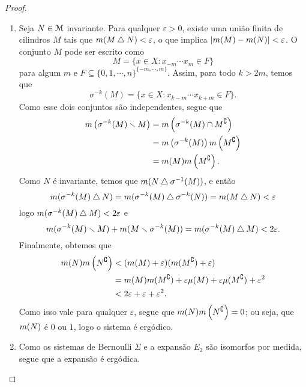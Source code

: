\begin{proof}
\begin{enumerate}
	\item Seja $N \in \mathcal{M}$ invariante. Para qualquer $\varepsilon>0$, existe uma união finita de cilindros $M$ tais que $m(M \mathbin{\triangle} N)<\varepsilon$, o que implica $|m(M)-m(N)|<\varepsilon$. O conjunto $M$ pode ser escrito como
	\begin{equation*}
	M = \{x \in X: x_{-m}\cdots x_m \in F\}
	\end{equation*}
para algum $m$ e $F \subseteq \{0,1,\cdots,n\}^{\{-m,\cdots,m\}}$. Assim, para todo $k>2m$, temos que
	\begin{equation*}
	\sigma^{-k}(M)=\{x \in X: x_{k-m}\cdots x_{k+m} \in F\}.
	\end{equation*}
Como esse dois conjuntos são independentes, segue que
	\begin{align*}
	m\left(\sigma^{-k}(M) \smallsetminus M\right) &= m\left(\sigma^{-k}(M) \cap M^ \complement\right) \\
		&=m\left(\sigma^{-k}(M)\right)m\left(M^\complement\right) \\
		&=m(M)m\left(M^\complement\right).
	\end{align*}
	Como $N$ é invariante, temos que $m(N \mathbin{\triangle} \sigma^{-1}(M))$, e então
	\begin{equation*}
	m(\sigma^{-k}(M) \mathbin{\triangle} N) =m(\sigma^{-k}(M) \mathbin{\triangle} \sigma^{-k}(N))=m(M \mathbin{\triangle} N)<\varepsilon
	\end{equation*}
logo $m(\sigma^{-k}(M) \mathbin{\triangle} M)<2\varepsilon$ e
	\begin{equation*}
	m(\sigma^{-k}(M) \smallsetminus M)+m(M \smallsetminus \sigma^{-k}(M)) = m(\sigma^{-k}(M) \mathbin{\triangle} M) < 2\varepsilon.
	\end{equation*}
Finalmente, obtemos que
	\begin{align*}
	m(N)m\left(N^\complement\right)&<(m(M)+\varepsilon)(m(M^\complement)+\varepsilon) \\
	&=m(M)m(M^\complement)+\varepsilon\mu(M)+\varepsilon\mu(M^\complement)+\varepsilon^2 \\
	&<2\varepsilon+\varepsilon+\varepsilon^2.
	\end{align*}
Como isso vale para qualquer $\varepsilon$, segue que $m(N)m\left(N^\complement\right)=0$; ou seja, que $m(N)$ é $0$ ou $1$, logo o sistema é ergódico.

	\item Como os sistemas de Bernoulli $\Sigma$ e a expansão $E_2$ são isomorfos por medida, segue que a expansão é ergódica.
\end{enumerate}
\end{proof}

